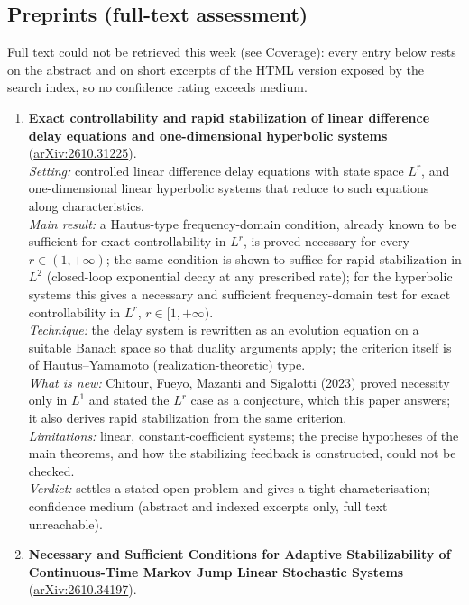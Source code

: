 \documentclass[11pt,a4paper]{article}
\begin{document}
\subsection*{Preprints (full-text assessment)}
Full text could not be retrieved this week (see Coverage): every entry below rests on the abstract and on short excerpts of the HTML version exposed by the search index, so no confidence rating exceeds medium.
\begin{enumerate}[leftmargin=*]
  \item \textbf{Exact controllability and rapid stabilization of linear difference delay equations and one-dimensional hyperbolic systems}~\cite{chitour2026exact} (\href{https://arxiv.org/abs/2610.31225}{arXiv:2610.31225}).\\
  \emph{Setting:} controlled linear difference delay equations with state space $L^r$, and one-dimensional linear hyperbolic systems that reduce to such equations along characteristics.\\
  \emph{Main result:} a Hautus-type frequency-domain condition, already known to be sufficient for exact controllability in $L^r$, is proved necessary for every $r \in (1,+\infty)$; the same condition is shown to suffice for rapid stabilization in $L^2$ (closed-loop exponential decay at any prescribed rate); for the hyperbolic systems this gives a necessary and sufficient frequency-domain test for exact controllability in $L^r$, $r \in [1,+\infty)$.\\
  \emph{Technique:} the delay system is rewritten as an evolution equation on a suitable Banach space so that duality arguments apply; the criterion itself is of Hautus--Yamamoto (realization-theoretic) type.\\
  \emph{What is new:} Chitour, Fueyo, Mazanti and Sigalotti (2023) proved necessity only in $L^1$ and stated the $L^r$ case as a conjecture, which this paper answers; it also derives rapid stabilization from the same criterion.\\
  \emph{Limitations:} linear, constant-coefficient systems; the precise hypotheses of the main theorems, and how the stabilizing feedback is constructed, could not be checked.\\
  \emph{Verdict:} settles a stated open problem and gives a tight characterisation; confidence medium (abstract and indexed excerpts only, full text unreachable).
  \item \textbf{Necessary and Sufficient Conditions for Adaptive Stabilizability of Continuous-Time Markov Jump Linear Stochastic Systems}~\cite{guo2026necessary} (\href{https://arxiv.org/abs/2610.34197}{arXiv:2610.34197}).\\

\end{enumerate}
\end{document}

